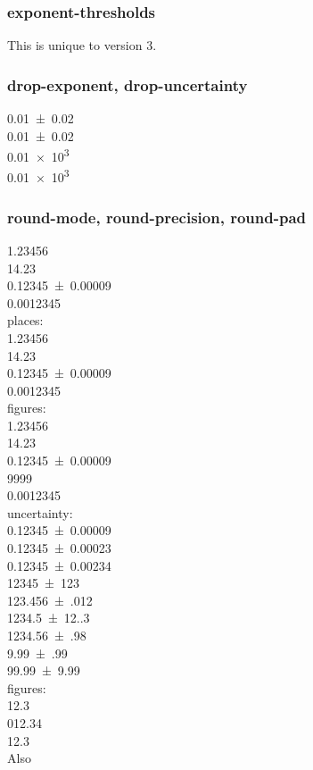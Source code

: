 \documentclass{article}
\begin{document}

\subsubsection{exponent-thresholds}
This is unique to version 3.

\subsubsection{drop-exponent, drop-uncertainty}
\num{0.01(2)} \\
\num[drop-uncertainty]{0.01(2)} \\
\num{0.01e3} \\
\num[drop-exponent]{0.01e3}  %

\subsubsection{round-mode, round-precision, round-pad}

{
\num{1.23456} \\
\num{14.23} \\
\num{0.12345(9)} \\
\num{0.0012345}\\
%
places:\\
\num{1.23456} \\
\num{14.23} \\
\num{0.12345(9)} \\
\num{0.0012345}\\
%
figures:\\
\num{1.23456} \\
\num{14.23} \\
\num{0.12345(9)} \\
\num{9999}\\
\num{0.0012345}\\
%
uncertainty:\\
\num{0.12345(9)} \\
\num{0.12345(23)} \\
\num{0.12345(234)}\\
\num{12345(123)}\\
\num{123.456(012)}\\
\num{1234.5(12.3)}\\
\num{1234.56(98)}\\
\num{9.99(99)}\\
\num{99.99(999)}\\
}%
{
%
figures:\\
\num{12.3} \\
\num{012.34} \\
\num[round-pad = false]{12.3}\\
}
Also\\
\end{document}
